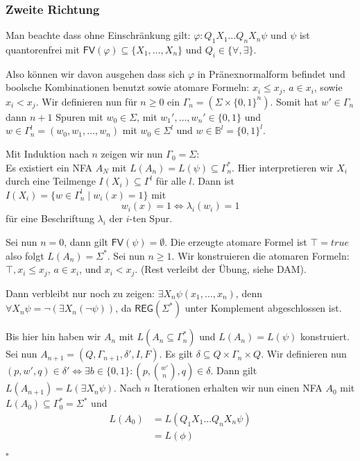 \documentclass[12pt, german]{article}
\newcommand{\B}{\mathbb{B}}
\newcommand{\sigstern}{\Sigma^\ast}
\newcommand{\fv}{\mathsf{FV}}
\newcommand{\reg}{\mathsf{REG}}
\newcommand{\bewiesen}{
	
	\begin{flushright}
		$\square$  \\
\end{flushright}}
\begin{document}
\subsubsection{Zweite Richtung}
	Man beachte dass ohne Einschränkung gilt: $\varphi : Q_1X_1\ldots Q_nX_n\psi$ und $\psi$ ist quantorenfrei 
	mit $\fv(\varphi) \subseteq \{X_1, \ldots, X_n\}$ und $Q_i \in \{\forall, \exists\}$. 
	\newline
	
	Also können wir davon ausgehen dass sich $\varphi$ in Pränexnormalform befindet und boolsche Kombinationen benutzt sowie atomare Formeln: 
	$x_i \leq x_j$, $a \in x_i$, sowie $x_i < x_j$. 
	Wir definieren nun für $n \geq 0$ ein $\Gamma_n = (\Sigma \times \{0,1\}^n)$. Somit hat $w' \in \Gamma_n$ dann $n+1$ Spuren mit $w_0 \in \Sigma$, 
	mit $w_1', \ldots, w_n' \in \{0,1\}$ und $w \in \Gamma_n^l = (w_0, w_1, \ldots, w_n)$ mit $w_0 \in \Sigma^l$ und $w \in \B^l = \{0,1\}^l$. 
	\newline
	
	Mit Induktion nach $n$ zeigen wir nun $\Gamma_0 = \Sigma$: \\
	Es existiert ein NFA $A_N$ mit $L(A_n) = L(\psi) \subseteq \Gamma_n^\ast$. Hier interpretieren wir $X_i$ durch eine Teilmenge $I(X_i) \subseteq \Gamma^l$ für alle $l$.
	Dann ist $I(X_i) = \{w \in \Gamma_n^l \mid w_i(x)= 1\}$ mit $$w_i(x) = 1 \iff \lambda_i(w_i) = 1$$ für eine Beschriftung $\lambda_i$ der $i$-ten Spur.
	\newline
	
	Sei nun $n= 0$, dann gilt $\fv(\psi) = \emptyset$. Die erzeugte atomare Formel ist $\top = true$ also folgt $L(A_n) = \sigstern$.
	Sei nun $n \geq 1$. Wir konstruieren die atomaren Formeln: $\top, x_i \leq x_j$, $a\in x_i$, und $x_i < x_j$. (Rest verleibt der Übung, siehe DAM).
	\newline 
	
	Dann verbleibt nur noch zu zeigen: $\exists X_n  \psi (x_1, \ldots, x_n)$, denn $\forall X_n \psi = \neg (\exists X_n(\neg\psi))$, da $\reg(\sigstern)$ unter Komplement abgeschlossen ist.
	\newline 
		
	Bis hier hin haben wir $A_n$ mit $L(A_n \subseteq \Gamma_n^\ast)$ und $L(A_n) = L(\psi)$ konstruiert. Sei nun $A_{n+1} = (Q, \Gamma_{n +1}, \delta', I, F)$. 
	Es gilt $\delta \subseteq Q \times \Gamma_n \times Q$. Wir definieren nun $(p, w ', q) \in \delta' \iff \exists b \in \{0,1\}: (p, \binom{w'}{n}, q) \in \delta$.
	Dann gilt $L(A_{n+1}) = L(\exists X_n \psi)$. Nach $n$ Iterationen erhalten wir nun einen NFA $A_0$ mit $L(A_0) \subseteq \Gamma_0^\ast = \sigstern$ und 
	\begin{align*}
		L(A_0) &= L(Q_1X_1\ldots Q_nX_n\psi) \\
		&=L(\phi)
	\end{align*}
	\bewiesen
	
\end{document}
